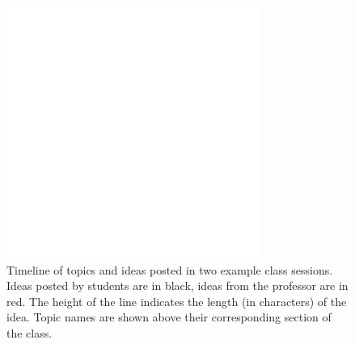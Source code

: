 \begin{figure}[t]
\centering
\includegraphics[width=3.25in]{figures/tincan/timeline.pdf}
\caption{Timeline of topics and ideas posted in two example class sessions. Ideas posted by students are in black, ideas from the professor are in red. The height of the line indicates the length (in characters) of the idea. Topic names are shown above their corresponding section of the class.}
\label{f:class_timelines}
\end{figure}





